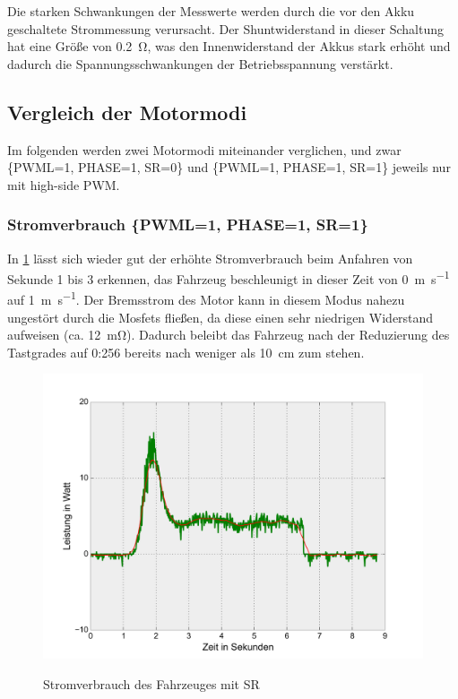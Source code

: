 Die starken Schwankungen der Messwerte werden durch die vor den Akku geschaltete Strommessung verursacht. Der Shuntwiderstand in dieser Schaltung hat eine Größe von
\SI{0,2}{\ohm}, was den Innenwiderstand der Akkus stark erhöht und dadurch die Spannungsschwankungen der Betriebsspannung verstärkt. 

\subsection{Vergleich der Motormodi}
Im folgenden werden zwei Motormodi miteinander verglichen, und zwar  \{PWML=1, PHASE=1, SR=0\} und  \{PWML=1, PHASE=1, SR=1\} jeweils nur mit high-side PWM.


\subsubsection{Stromverbrauch \{PWML=1, PHASE=1, SR=1\}}

In \cref{fig:power_consumption_sr} lässt sich wieder gut der erhöhte Stromverbrauch beim Anfahren von Sekunde 1 bis 3 erkennen, das Fahrzeug beschleunigt in dieser Zeit
von \SI{0}{\metre\per\second} auf \SI{1}{\metre\per\second}. Der Bremsstrom des Motor kann in diesem Modus nahezu ungestört durch die Mosfets fließen, da diese einen
sehr niedrigen Widerstand aufweisen (ca. \SI{12}{\mohm}). Dadurch beleibt das Fahrzeug nach der Reduzierung des Tastgrades auf 0:256 bereits nach weniger als \SI{10}{cm} zum stehen.

\begin{figure}[H]
\centering
\includegraphics[width=.8\textwidth]{Strom/sr_power.png}\\
\caption{Stromverbrauch des Fahrzeuges mit SR}%
\label{fig:power_consumption_sr}
\end{figure}

